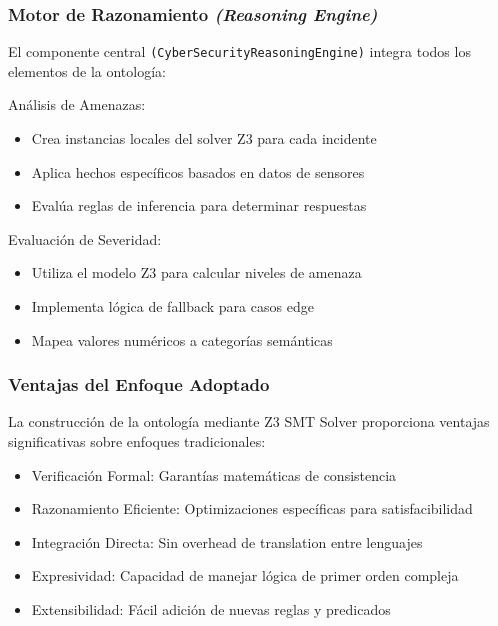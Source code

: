 \subsubsection{Motor de Razonamiento \textit{(Reasoning Engine)}}

El componente central \verb|(CyberSecurityReasoningEngine)| integra todos los elementos de la ontología:

\noindent Análisis de Amenazas:

\begin{itemize}
    \item Crea instancias locales del solver Z3 para cada incidente
    \item Aplica hechos específicos basados en datos de sensores
    \item Evalúa reglas de inferencia para determinar respuestas 
\end{itemize}


\noindent Evaluación de Severidad:

\begin{itemize}
    \item Utiliza el modelo Z3 para calcular niveles de amenaza
    \item Implementa lógica de fallback para casos edge
    \item Mapea valores numéricos a categorías semánticas 
\end{itemize}

\subsubsection{Ventajas del Enfoque Adoptado}

La construcción de la ontología mediante Z3 SMT Solver proporciona ventajas significativas sobre enfoques tradicionales:

\begin{itemize}
    \item Verificación Formal: Garantías matemáticas de consistencia
    \item Razonamiento Eficiente: Optimizaciones específicas para satisfacibilidad
    \item Integración Directa: Sin overhead de translation entre lenguajes
    \item Expresividad: Capacidad de manejar lógica de primer orden compleja
    \item Extensibilidad: Fácil adición de nuevas reglas y predicados
\end{itemize}

